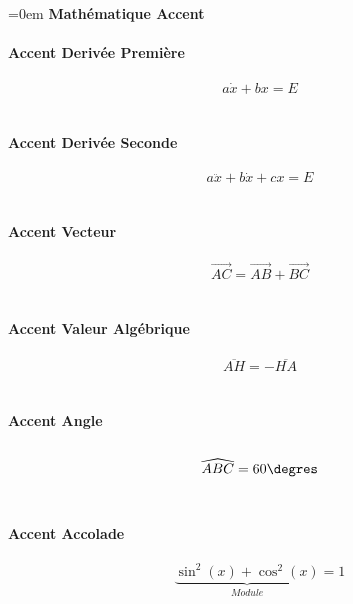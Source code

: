\documentclass{article}
\begin{document}
\parindent=0em
\textbf{Mathématique Accent} \\ \\
\textbf{Accent Derivée Première} \\ \\
$$a\dot{x}+bx=E$$ \\ \\
\textbf{Accent Derivée Seconde} \\ \\
$$a\ddot{x}+b\dot{x}+cx=E$$ \\ \\
\textbf{Accent Vecteur} \\ \\
$$\overrightarrow{AC}=\overrightarrow{AB}+\overrightarrow{BC}$$ \\ \\
\textbf{Accent Valeur Algébrique} \\ \\
$$\overline{AH}=-\overline{HA}$$ \\ \\
\textbf{Accent Angle} \\ \\
$$\widehat{ABC}=60\degres$$ \\ \\
\textbf{Accent Accolade} \\ \\
$$\underbrace{\sin^2(x)+\cos^2(x)}_{Module}=1$$ \\ \\
\end{document}
